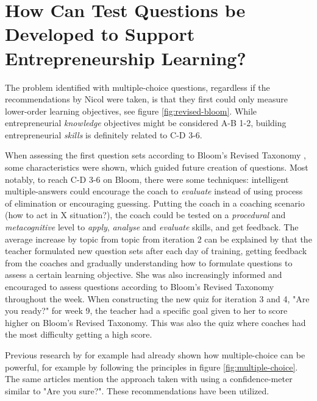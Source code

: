 
\section{How Can Test Questions be Developed to Support Entrepreneurship Learning?} %

  The problem identified with multiple-choice questions, regardless if the recommendations by Nicol \cite{nicol} were taken, is that they first could only measure lower-order learning objectives, see figure \ref{fig:revised-bloom}. While entrepreneurial \textit{knowledge} objectives might be considered A-B 1-2, building entrepreneurial \textit{skills} is definitely related to C-D 3-6.

  When assessing the first question sets according to Bloom's Revised Taxonomy \citep{krathwohl}, some characteristics were shown, which guided future creation of questions. Most notably, to reach C-D 3-6 on Bloom, there were some techniques: intelligent multiple-answers could encourage the coach to \textit{evaluate} instead of using process of elimination or encouraging guessing. Putting the coach in a coaching scenario (how to act in X situation?), the coach could be tested on a \textit{procedural} and \textit{metacognitive} level to \textit{apply}, \textit{analyse} and \textit{evaluate} skills, and get feedback. The average increase by topic from topic from iteration 2 can be explained by that the teacher formulated new question sets after each day of training, getting feedback from the coaches and gradually understanding how to formulate questions to assess a certain learning objective. She was also increasingly informed and encouraged to assess questions according to Bloom's Revised Taxonomy throughout the week. When constructing the new quiz for iteration 3 and 4, "Are you ready?" for week 9, the teacher had a specific goal given to her to score higher on Bloom's Revised Taxonomy. This was also the quiz where coaches had the most difficulty getting a high score.

  Previous research by for example \cite{nicol} had already shown how multiple-choice can be powerful, for example by following the principles in figure \ref{fig:multiple-choice}. The same articles mention the approach taken with using a confidence-meter similar to "Are you sure?". These recommendations have been utilized.

